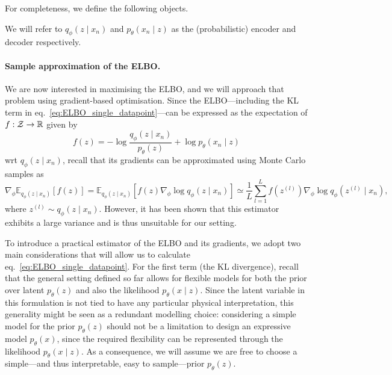 For completeness, we define the following objects. 

\begin{definition}
    We will refer to $q_\phi(z \mid x_n)$ and $p_\theta(x_n \mid z)$ as the (probabilistic) encoder and decoder respectively.
\end{definition}

\paragraph{Sample approximation of the ELBO.}


We are now interested in maximising the ELBO, and we will approach that problem using gradient-based optimisation. Since the ELBO---including the KL term in eq.~\eqref{eq:ELBO_single_datapoint}---can be expressed  as the expectation of $f:{\mathcal Z}\to{\mathbb R}$ given by 
\begin{equation}
    f(z) = - \log\frac{q_\phi(z \mid x_n)}{p_\theta(z)} + \log p_\theta(x_n \mid z)
\end{equation}
wrt $q_\phi(z \mid x_n)$, recall that its gradients can be approximated using Monte Carlo samples as
\begin{equation}
    \label{eq:MC_ELBO}
    \nabla_\phi \mathbb{E}_{q_\phi(z \mid x_n)}\left[f(z)\right] 
    = \mathbb{E}_{q_\phi(z \mid x_n)}\left[f(z) \nabla_\phi \log q_\phi(z \mid x_n) \right]
    \simeq \frac{1}{L} \sum_{l=1}^{L} f(z^{(l)}) \nabla_\phi \log q_\phi(z^{(l)} \mid x_n),
\end{equation}
where $z^{(l)}\sim q_\phi(z \mid x_n)$. However, it has been shown that this estimator exhibits a large variance and is thus unsuitable for our setting.

To introduce a practical estimator of the ELBO and its gradients, we adopt two main considerations that will allow us to calculate eq.~\eqref{eq:ELBO_single_datapoint}. For the first term (the KL divergence), recall that the general setting defined so far allows for flexible models for both the prior over latent $p_\theta(z)$ and also the likelihood $p_\theta(x \mid z)$. Since the latent variable in this formulation is not tied to have any particular physical interpretation, this generality might be seen as a redundant modelling choice: considering a simple model for the prior $p_\theta(z)$ should not be a limitation to design an expressive model $p_\theta(x)$, since the required flexibility can be represented through the likelihood $p_\theta(x \mid z)$. As a consequence, we will assume we are free to choose a simple---and thus interpretable, easy to sample---prior $p_\theta(z)$. 

